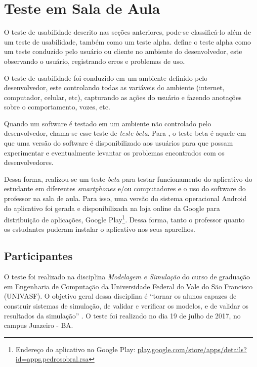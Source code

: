 \section{Teste em Sala de Aula}

O teste de usabilidade descrito nas seções anteriores, pode-se classificá-lo além de um teste de usabilidade,
também como um teste alpha.  define o teste alpha como um teste
conduzido pelo usuário ou cliente no ambiente do desenvolvedor, este observando
o usuário, registrando erros e problemas de uso.

O teste de usabilidade foi conduzido em um ambiente definido pelo desenvolvedor, este controlando
todas as variáveis do ambiente (internet, computador, celular, etc), capturando as ações do usuário e
fazendo anotações sobre o comportamento, vozes, etc.

Quando um software é testado em um ambiente não controlado pelo desenvolvedor,
chama-se esse teste de \textit{teste beta}. Para , o teste beta é aquele em
que uma versão do software é disponibilizado aos usuários para que possam experimentar e
eventualmente levantar os problemas encontrados com os desenvolvedores.


Dessa forma, realizou-se um teste \textit{beta} para testar funcionamento do aplicativo do estudante em diferentes
\textit{smartphones} e/ou computadores e o uso do software do professor na sala de aula.
Para isso, uma versão do sistema operacional Android do aplicativo foi gerada e disponibilizada na
loja online da Google para distribuição de aplicações, Google Play\footnote{Endereço do aplicativo no Google Play: \href{https://play.google.com/store/apps/details?id=apps.pedrosobral.rsa}{play.google.com/store/apps/details?id=apps.pedrosobral.rsa}}.
Dessa forma, tanto o professor quanto os estudantes puderam instalar o aplicativo nos seus aparelhos.

\subsection{Participantes}

O teste foi realizado na disciplina \textit{Modelagem e Simulação} do curso de graduação
em Engenharia de Computação da Universidade Federal do Vale do São Francisco (UNIVASF).
O objetivo geral dessa disciplina é ``tornar os alunos capazes de construir sistemas de
simulação, de validar e verificar os modelos, e de validar os resultados da simulação'' \cite{ppcComputacao}.
O teste foi realizado no dia 19 de julho de 2017, no campus Juazeiro - BA.

